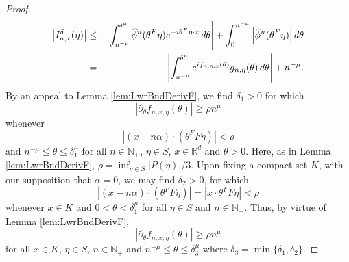 \documentclass[11pt]{article}
\begin{document}
\begin{proof}
\begin{eqnarray*}
\abs{I_{n,x}^\delta(\eta)}
&\leq & 
\abs{\int_{n^{-\mu}}^{\delta^{\mu}}\widehat{\phi}^n(\theta^F\eta)e^{-i\theta^F\eta\cdot x}\,d\theta} +\int_{0}^{n^{-\mu}}\abs{\widehat{\phi}^n(\theta^F\eta)}\,d\theta\\
&=&
\abs{\int_{n^{-\mu}}^{\delta^\mu} e^{i f_{n,\eta,x}(\theta) } g_{n,\eta}(\theta)\,d\theta} 
+ n^{-\mu}.
\end{eqnarray*}
By an appeal to Lemma \ref{lem:LwrBndDerivF}, we find $\delta_1>0$ for which
\begin{equation*}
    |\partial_{\theta}f_{n,x,\eta}(\theta)|\geq \rho n^{\mu}
\end{equation*}
whenever
\begin{equation*}
    |(x-n\alpha)\cdot(\theta^F F\eta)|<\rho
\end{equation*}
and $n^{-\mu}\leq\theta\leq \delta^\mu_1$ for all $n\in\mathbb{N}_+$, $\eta\in S$, $x\in\mathbb{R}^d$ and $\theta>0$. Here, as in Lemma \ref{lem:LwrBndDerivF}, $\rho=\inf_{\eta\in S}|P(\eta)|/3$. Upon fixing a compact set $K$, with our supposition that $\alpha=0$, we may find $\delta_2>0$, for which
\begin{equation*}
    |(x-n\alpha) \cdot (\theta^F F \eta)|=|x\cdot \theta^F F\eta|<\rho
\end{equation*}
whenever $x\in K$ and $0<\theta<\delta_1^\mu$ for all $\eta\in S$ and $n\in\mathbb{N}_+$. Thus, by virtue of Lemma \ref{lem:LwrBndDerivF}, 
\begin{equation*}
    |\partial_\theta f_{n,x,\eta}(\theta)|\geq \rho n^{\mu}
\end{equation*}
for all $x\in K$, $\eta\in S$, $n\in\mathbb{N}_+$ and $n^{-\mu}\leq \theta\leq \delta_3^{\mu}$ where $\delta_3=\min\{\delta_1,\delta_2\}$.


\end{proof}
\end{document}
